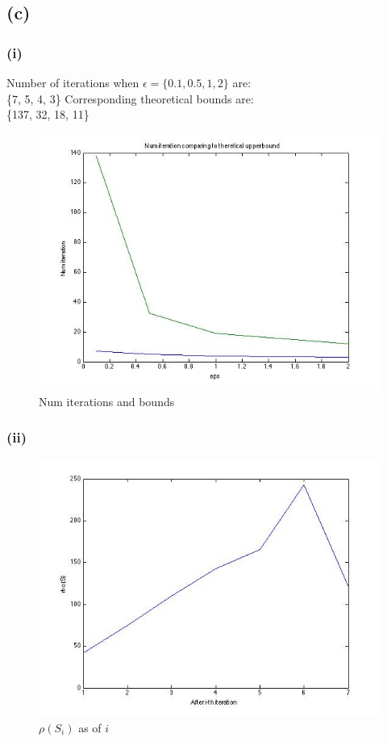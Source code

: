 \documentclass{article}
\begin{document}
 \subsection{(c)}
  \subsubsection{(i)}
 Number of iterations when $\epsilon = \{0.1, 0.5, 1, 2\}$ are: \\
  \{7, 5, 4, 3\}
 Corresponding theoretical bounds are: \\
 \{137, 32, 18, 11\}
 

   \begin{figure}[H]
\centering
\includegraphics[scale=0.5]{q4-NumIterations.jpg}
\caption{ Num iterations and bounds }
\label{}
\end{figure}

\subsubsection{(ii)}


\begin{figure}[H]
\centering
\includegraphics[scale=0.5]{q4-RhoSi.jpg}
\caption{ $\rho(S_i)$ as of $i$ }
\label{}
\end{figure}
\end{document}
